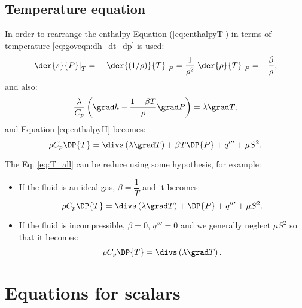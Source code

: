 \subsection{Temperature equation}

In order to rearrange the enthalpy Equation (\ref{eq:enthalpyT}) in terms of temperature \eqref{eq:goveqn:dh_dt_dp} is used:
\begin{equation}
 \left.\der{s}{P}\right|_T = -  \left.\der{(1/\rho)}{T}\right|_P = \frac{1}{\rho^2} \left.\der{\rho}{T}\right|_P=-\frac{\beta}{\rho},
\end{equation}
and also:
%
\begin{equation}
\dfrac{\lambda}{C_p} \left(\grad h -\dfrac{1-\beta T }{\rho}\grad P\right) = \lambda \grad T,
\end{equation}
%
 and Equation \eqref{eq:enthalpyH} becomes:
\begin{equation}
  \rho C_p \DP{T}=  \divs \left( \lambda \grad T \right) + \beta T \DP{P} +q''' + \mu S^2.
\label{eq:T_all}
\end{equation}

The Eq. \eqref{eq:T_all} can be reduce using some hypothesis, for example:
\begin{itemize}
 \item If the fluid is an ideal gas, $\beta=\dfrac{1}{T}$ and it becomes:
\begin{equation}
  \rho C_p \DP{T}=  \divs \left( \lambda \grad T \right) + \DP{P} +q''' + \mu S^2.
\end{equation}

 \item If the fluid is incompressible, $\beta=0$, $q'''=0 $ and we generally neglect $\mu S^2$  so that it becomes:
\begin{equation}
  \rho C_p \DP{T}=  \divs \left( \lambda \grad T \right).
\end{equation}
\end{itemize}

\section{Equations for scalars}

